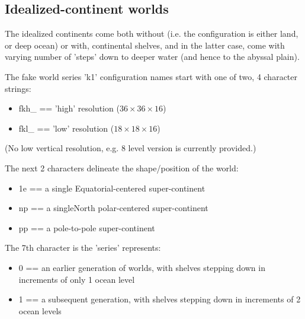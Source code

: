\documentclass[11pt,fleqn]{book} %
\begin{document}
%
\subsection{Idealized-continent worlds}

The idealized continents come both without (i.e. the configuration is either land, or deep ocean) or with, continental shelves, and in the latter case, come with varying number of 'steps' down to deeper water (and hence to the abyssal plain).

The fake world series 'k1' configuration names start with one of two, 4 character strings:
\begin{itemize}[noitemsep]
\vspace{1mm}
\item \textsf{\footnotesize fkh\_} == 'high' resolution (\(36\times36\times16\))
\item \textsf{\footnotesize fkl\_} == 'low' resolution (\(18\times18\times16\))
\end{itemize}
\vspace{1mm}
\noindent (No low vertical resolution, e.g. \(8\) level version is currently provided.)
\vspace{1mm}

The next 2 characters delineate the shape/position of the world:
\begin{itemize}[noitemsep]
\vspace{1mm}
\item \textsf{\footnotesize 1e} == a single Equatorial-centered super-continent
\item \textsf{\footnotesize np} == a singleNorth polar-centered super-continent
\item \textsf{\footnotesize pp} == a pole-to-pole super-continent
\end{itemize}
\vspace{2mm}

The 7th character is the 'series' represents:
\begin{itemize}[noitemsep]
\vspace{1mm}
\item \textsf{\footnotesize 0} == an earlier generation of worlds, with shelves stepping down in increments of only 1 ocean level
\vspace{1mm}
\item \textsf{\footnotesize 1} == a subsequent generation, with shelves stepping down in increments of 2 ocean levels
\end{itemize}
\vspace{2mm}
\end{document}
